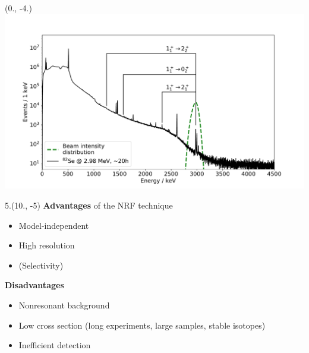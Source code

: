 



\begin{textblock}{9.5}(0., -4.)
    \includegraphics[width=\textwidth, trim=50 0 50 50,clip]{figures/se82_spectrum_branchings.pdf}
\end{textblock}

\begin{textblock}{5.}(10., -5)
    \color{green}\textbf{Advantages} \color{black} of the NRF technique
    \begin{itemize}
        \item Model-independent
        \item High resolution
        \item (Selectivity)
    \end{itemize}
    
    \color{red}\textbf{Disadvantages}\color{black}
    \begin{itemize}
        \item Nonresonant background
        \item Low cross section (long experiments, large samples, stable isotopes)
        \item Inefficient detection
    \end{itemize}
\end{textblock}
